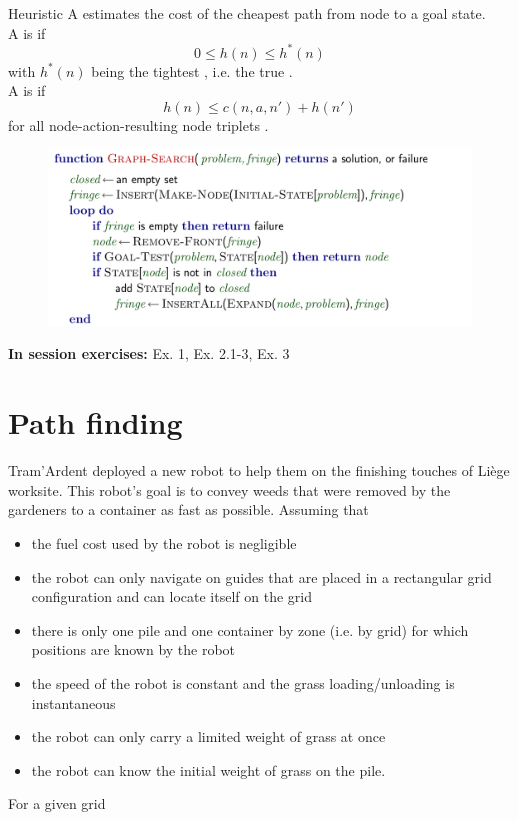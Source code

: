 \documentclass[11pt, a4paper]{article}
\begin{document}
\begin{thbox}{Heuristic}
    A  estimates the cost of the cheapest path from node  to a goal state.\\
    A  is  if
    $$0 \leq h(n) \leq h^*(n)$$
    with $h^*(n)$ being the tightest , i.e. the true .\\
    A  is  if
    $$h(n) \leq c(n,a,n') + h(n')$$
    for all node-action-resulting node triplets .
\end{thbox}

\begin{figure}[h]
    \centering
    \includegraphics[width=.9\linewidth]{figures/graph-search.png}
\end{figure}


\textbf{In session exercises:} Ex. 1, Ex. 2.1-3, Ex. 3 

\newpage

\section{Path finding}

Tram'Ardent deployed a new robot to help them on the finishing touches of Liège worksite. This robot's goal is to convey weeds that were removed by the gardeners to a container as fast as possible. Assuming that 
\begin{itemize}
    \item the fuel cost used by the robot is negligible
    \item the robot can only navigate on guides that are placed in a rectangular grid configuration and can locate itself on the grid
    \item there is only one pile and one container by zone (i.e. by grid) for which positions are known by the robot
    \item the speed of the robot is constant and the grass loading/unloading is instantaneous
    \item the robot can only carry a limited weight of grass at once
    \item the robot can know the initial weight of grass on the pile.
\end{itemize}
For a given grid
\end{document}

